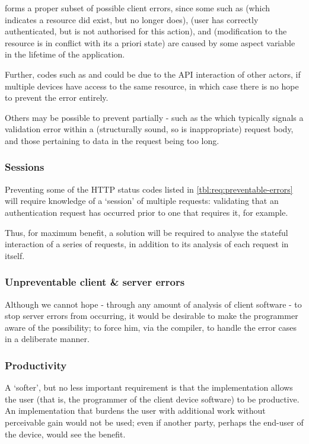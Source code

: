  forms a proper subset of possible client errors, since some such as  (which indicates a resource did exist, but no longer does),  (user has correctly authenticated, but is not authorised for this action), and  (modification to the resource is in conflict with its a priori state) are caused by some aspect variable in the lifetime of the application.

Further, codes such as  and  could be due to the API interaction of other actors, if multiple devices have access to the same resource, in which case there is no hope to prevent the error entirely.

Others may be possible to prevent partially - such as the  which typically signals a validation error within a (structurally sound, so  is inappropriate) request body, and those pertaining to data in the request being too long.

\subsubsection{Sessions} \label{intro:req:sessions}
Preventing some of the HTTP status codes listed in \cref{tbl:req:preventable-errors} will require knowledge of a `session' of multiple requests: validating that an authentication request has occurred prior to one that requires it, for example.

Thus, for maximum benefit, a solution will be required to analyse the stateful interaction of a series of requests, in addition to its analysis of each request in itself.

\subsubsection{Unpreventable client \& server errors} \label{intro:req:unpreventable}
Although we cannot hope - through any amount of analysis of client software - to stop server errors from occurring, it would be desirable to make the programmer aware of the possibility; to force him, via the compiler, to handle the error cases in a deliberate manner.

\subsubsection{Productivity} \label{intro:req:productivity}
A `softer', but no less important requirement is that the implementation allows the user (that is, the programmer of the client device software) to be productive. An implementation that burdens the user with additional work without perceivable gain would not be used; even if another party, perhaps the end-user of the device, would see the benefit.

